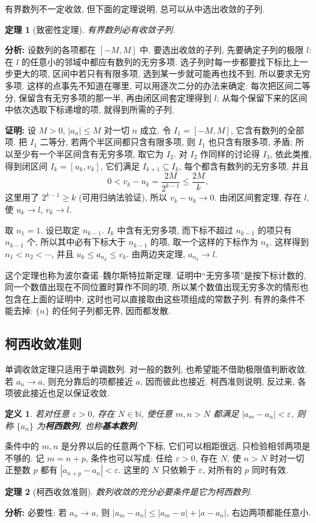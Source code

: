 \documentclass[UTF8,openany]{ctexbook}
\theoremstyle{chinesetextbook}
\newtheorem{definition}{定义}[section]
\newtheorem{theorem}{定理}[section]
\newenvironment{cnproof}{\par\indent\textbf{证明:} \ignorespaces}{\par}
\begin{document}
有界数列不一定收敛, 但下面的定理说明, 总可以从中选出收敛的子列.
\begin{theorem}[致密性定理]
有界数列必有收敛子列.
\end{theorem}
\par\indent\textbf{分析:} 设数列的各项都在 $[-M,M]$ 中. 要选出收敛的子列, 先要确定子列的极限 $l$: 在 $l$ 的任意小的邻域中都应有数列的无穷多项. 选子列时每一步都要找下标比上一步更大的项, 区间中若只有有限多项, 选到某一步就可能再也找不到, 所以要求无穷多项. 这样的点事先不知道在哪里, 可以用逐次二分的办法来确定: 每次把区间二等分, 保留含有无穷多项的那一半, 再由闭区间套定理得到 $l$; 从每个保留下来的区间中依次选取下标递增的项, 就得到所需的子列.
\begin{cnproof}
设 $M>0$, $|a_n|\le M$ 对一切 $n$ 成立. 令 $I_1=[-M,M]$, 它含有数列的全部项. 把 $I_1$ 二等分, 若两个半区间都只含有限多项, 则 $I_1$ 也只含有限多项, 矛盾; 所以至少有一个半区间含有无穷多项, 取它为 $I_2$. 对 $I_2$ 作同样的讨论得 $I_3$, 依此类推, 得到闭区间 $I_k=[u_k,v_k]$, 它们满足 $I_{k+1}\subseteq I_k$, 每个都含有数列的无穷多项, 并且
\[
0<v_k-u_k=\frac{2M}{2^{k-1}}\le\frac{2M}k,
\]
这里用了 $2^{k-1}\ge k$ (可用归纳法验证), 所以 $v_k-u_k\to0$. 由闭区间套定理, 存在 $l$, 使 $u_k\to l$, $v_k\to l$.

取 $n_1=1$. 设已取定 $n_{k-1}$. $I_k$ 中含有无穷多项, 而下标不超过 $n_{k-1}$ 的项只有 $n_{k-1}$ 个, 所以其中必有下标大于 $n_{k-1}$ 的项, 取一个这样的下标作为 $n_k$. 这样得到 $n_1<n_2<\cdots$, 并且 $u_k\le a_{n_k}\le v_k$. 由两边夹定理, $a_{n_k}\to l$.
\end{cnproof}
这个定理也称为波尔查诺--魏尔斯特拉斯定理. 证明中“无穷多项”是按下标计数的, 同一个数值出现在不同位置时算作不同的项, 所以某个数值出现无穷多次的情形也包含在上面的证明中; 这时也可以直接取由这些项组成的常数子列. 有界的条件不能去掉: $\{n\}$ 的任何子列都无界, 因而都发散.
\subsection{柯西收敛准则}
单调收敛定理只适用于单调数列. 对一般的数列, 也希望能不借助极限值判断收敛. 若 $a_n\to a$, 则充分靠后的项都接近 $a$, 因而彼此也接近. 柯西准则说明, 反过来, 各项彼此接近也足以保证收敛.
\begin{definition}
若对任意 $\varepsilon>0$, 存在 $N\in\mathbb N$, 使任意 $m,n>N$ 都满足 $|a_m-a_n|<\varepsilon$, 则称 $\{a_n\}$ 为\textbf{柯西数列}, 也称\textbf{基本数列}.
\end{definition}
条件中的 $m,n$ 是分界以后的任意两个下标, 它们可以相距很远, 只检验相邻两项是不够的. 记 $m=n+p$, 条件也可以写成: 任给 $\varepsilon>0$, 存在 $N$, 使 $n>N$ 时对一切正整数 $p$ 都有 $|a_{n+p}-a_n|<\varepsilon$. 这里的 $N$ 只依赖于 $\varepsilon$, 对所有的 $p$ 同时有效.
\begin{theorem}[柯西收敛准则]
数列收敛的充分必要条件是它为柯西数列.
\end{theorem}
\par\indent\textbf{分析:} 必要性: 若 $a_n\to a$, 则 $|a_m-a_n|\le|a_m-a|+|a-a_n|$, 右边两项都能任意小.
\end{document}

